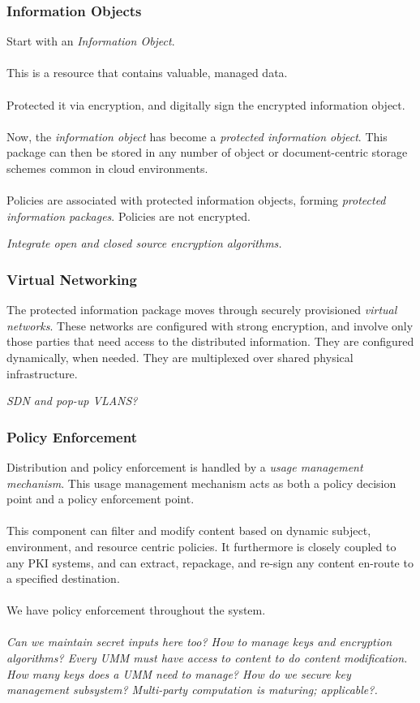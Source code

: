 \documentclass[t,handout]{beamer}
\begin{document}
\begin{frame}
\frametitle{Information Objects}
Start with an {\sl Information Object}.\\~\\

This is a resource that contains valuable, managed data.\\~\\

Protected it via encryption, and digitally sign the encrypted information object. \\~\\

Now, the {\sl information object} has become a {\sl protected information object}.  This package can then be stored in any number of object or document-centric storage schemes common in cloud environments.\\~\\

Policies are associated with protected information objects, forming {\sl protected information packages}.  Policies are not encrypted.

{\sl Integrate open and closed source encryption algorithms. }
\end{frame}

\begin{frame}
\frametitle{Virtual Networking}
The protected information package moves through securely provisioned {\sl virtual networks}.  These networks are configured with strong encryption, and involve only those parties that need access to the distributed information.  They are configured dynamically, when needed.  They are multiplexed over shared physical infrastructure.

{\sl SDN and pop-up VLANS?}
\end{frame}

\begin{frame}
\frametitle{Policy Enforcement}
Distribution and policy enforcement is handled by a {\sl usage management mechanism}.  This usage management mechanism acts as both a policy decision point and a policy enforcement point. \\~\\

This component can filter and modify content based on dynamic subject, environment, and resource centric policies. It furthermore is closely coupled to any PKI systems, and can extract, repackage, and re-sign any content en-route to a specified destination.\\~\\

We have policy enforcement throughout the system.\\~\\

{\sl Can we maintain secret inputs here too? How to manage keys and encryption algorithms? Every UMM must have access to content to do content modification. How many keys does a UMM need to manage? How do we secure key management subsystem?  Multi-party computation is maturing; applicable?.}
\end{frame}
\end{document}
